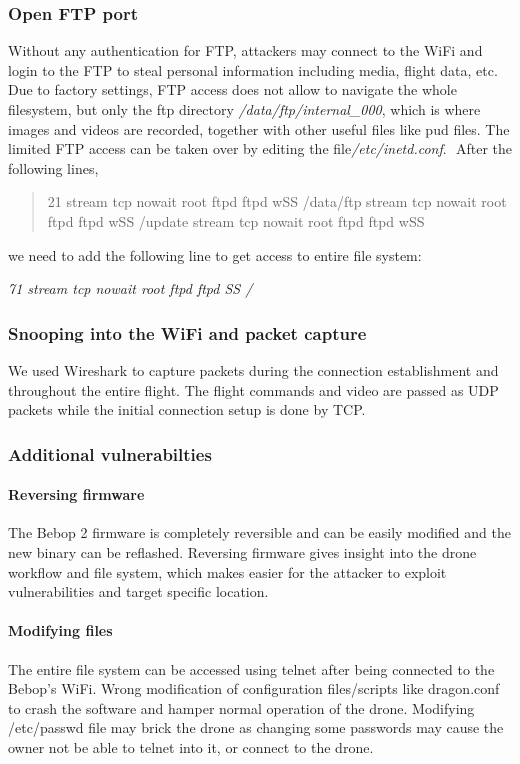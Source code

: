 \documentclass[conference]{IEEEtran}
\begin{document}
\subsubsection{Open FTP port}
Without any authentication for FTP, attackers may connect to the WiFi and login to the FTP to steal personal information including media, flight data, etc. Due to factory settings, FTP access does not allow to navigate the whole filesystem, but only the ftp directory \emph{/data/ftp/internal\_000}, which is where images and videos are recorded, together with other useful files like pud files.
The limited FTP access can be taken over by editing the file \emph{​/etc/inetd.conf}. ​
After the following lines, 
\begin{quote}
	21 stream tcp nowait root ftpd ftpd ­wSS /data/ftp
	 stream tcp nowait root ftpd ftpd ­wSS /update
	 stream tcp nowait root ftpd ftpd ­wSS	
\end{quote}
we need to add the following line to get access to entire file system:

\emph{71 stream tcp nowait root ftpd ftpd ­SS /} 

\subsubsection{Snooping into the WiFi and packet capture}
We used Wireshark to capture packets during the connection establishment and throughout the entire flight. The flight commands and video are passed as UDP packets while the initial connection setup is done by TCP. 


\subsubsection{Additional vulnerabilties}
\paragraph{Reversing firmware}
The Bebop 2 firmware is completely reversible and can be easily modified and the new binary can be reflashed. Reversing firmware gives insight into the drone workflow and file system, which makes easier for the attacker to exploit vulnerabilities and target specific location.
\paragraph{Modifying files}
The entire file system can be accessed using telnet after being connected to the Bebop's WiFi. Wrong modification of configuration files/scripts like dragon.conf to crash the software and hamper normal operation of the drone. 
Modifying /etc/passwd file may brick the drone as changing some passwords may cause the owner not be able to telnet into it, or connect to the drone.
\end{document}
